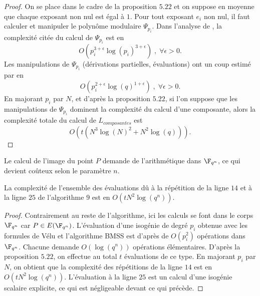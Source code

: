 \begin{proof}
	On se place dans le cadre de la proposition $5.22$ et on suppose en moyenne que chaque exposant non nul est égal à $1$. Pour tout exposant $e_{i}$ non nul, il faut calculer et manipuler le polynôme modulaire $\Psi_{p_{i}}$. Dans l'analyse de \cite{JaoSoukharev}, la complexité citée du calcul de  $\Psi_{p_{i}}$ est en
	\begin{equation*}
		 O\left( p_{i}^{3 + \epsilon}\log\left( p_{i}\right)^{3 + \epsilon} \right)\;,\;\forall\epsilon >0.
	\end{equation*}
	Les manipulations de $\Psi_{p_{i}}$ (dérivations partielles, évaluations) ont un coup estimé par \cite{JaoSoukharev} en 
	\begin{equation*}
		O\left(p_{i}^{2 + \epsilon}\log\left( q \right)^{1 + \epsilon} \right)\;,\;\forall\epsilon >0.
	\end{equation*}
	En majorant $p_{i}$ par $N$, et d'après la proposition $5.22$, si l'on suppose que les manipulations de $\Psi_{p_{i}}$ dominent la complexité du calcul d'une composante, alors la complexité totale du calcul de $L_{composantes}$ est
	\begin{equation*}
		O\left( t \left( N^3\log(N)^{2} + N^2\log(q) \right) \right). 
	\end{equation*}
\end{proof}

Le calcul de l'image du point $P$ demande de l'arithmétique dans $\F_{q^{n}}$, ce qui devient coûteux selon le paramètre $n$.  

\begin{Prop}
	La complexité de l'ensemble des évaluations dû à la répétition de la ligne $14$ et à la ligne $25$ de l'algorithme $9$ est en $O(tN^2\log(q^n))$.
\end{Prop}

\begin{proof}
	Contrairement au reste de l'algorithme, ici les calculs se font dans le corps $\F_{q^{n}}$ car $P\in E(\F_{q^{n}})$. L'évaluation d'une isogénie de degré $p_{i}$ obtenue avec les formules de Vélu et l'algorithme BMSS est d'après \cite{JaoSoukharev} de $O(p_{i}^{2})$ opérations dans $\F_{q^{n}}$. Chacune demande $O(\log(q^n))$ opérations élémentaires. D'après la proposition $5.22$, on effectue au total $t$ évaluations de ce type. En majorant $p_{i}$ par $N$, on obtient que la complexité des répétitions de la ligne $14$ est en $O(tN^2\log(q^n))$. L’évaluation à la ligne $25$ est un calcul d'une isogénie scalaire explicite, ce qui est négligeable devant ce qui précède.  
\end{proof}

